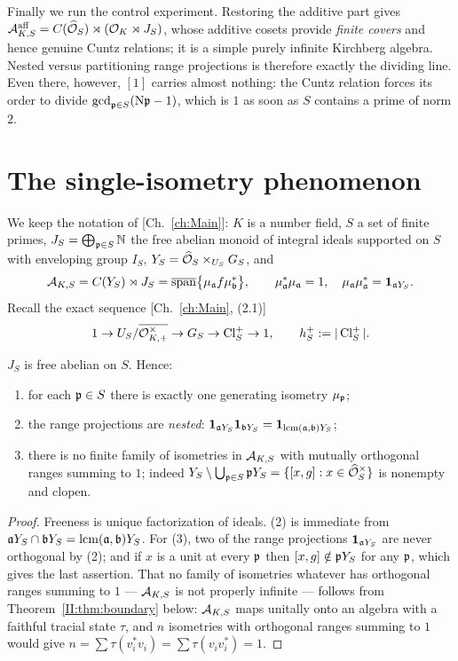 \begin{summary}
Finally we run the control experiment. Restoring the additive part gives
$\mathcal{A}^{\mathrm{aff}}_{K,S}=C(\widehat{\mathcal{O}}_S)\rtimes(\mathcal{O}_K\rtimes J_S)$, whose additive cosets provide
\emph{finite covers} and hence genuine Cuntz relations; it is a simple purely infinite
Kirchberg algebra. Nested versus partitioning range projections is therefore
exactly the dividing line. Even there, however, $[1]$ carries almost nothing: the Cuntz
relation forces its order to divide $\gcd_{\mathfrak{p}\in S}(\mathrm{N}\mathfrak{p}-1)$, which is $1$ as soon as
$S$ contains a prime of norm $2$.
\end{summary}

\section{The single-isometry phenomenon}

We keep the notation of [Ch.~\ref{ch:Main}]: $K$ is a number field, $S$ a set of finite primes,
$J_S=\bigoplus_{\mathfrak{p}\in S}\mathbb{N}$ the free abelian monoid of integral ideals supported on $S$
with enveloping group $I_S$, $Y_S=\widehat{\mathcal{O}}_S\times_{U_S}G_S$, and
\[
\mathcal{A}_{K,S}=C(Y_S)\rtimes J_S=\overline{\operatorname{span}}\bigl\{\mu_{\mathfrak{a}} f\mu_{\mathfrak{b}}^*\bigr\},
\qquad \mu_{\mathfrak{a}}^*\mu_{\mathfrak{a}}=1,\quad \mu_{\mathfrak{a}}\mu_{\mathfrak{a}}^*=\mathbf 1_{\mathfrak{a} Y_S}.
\]
Recall the exact sequence [Ch.~\ref{ch:Main}, (2.1)]
\begin{equation}\label{II:eq:exact}
1\to U_S/\overline{\mathcal{O}^\times_{K,+}}\to G_S\to\operatorname{Cl}^+_S\to1,\qquad h^+_S:=|\operatorname{Cl}^+_S| .
\end{equation}

\begin{lemma}\label{II:lem:single}
$J_S$ is free abelian on $S$. Hence:
\begin{enumerate}
\item for each $\mathfrak{p}\in S$ there is exactly one generating isometry $\mu_{\mathfrak{p}}$;
\item the range projections are \emph{nested}:
$\mathbf 1_{\mathfrak{a} Y_S}\mathbf 1_{\mathfrak{b} Y_S}=\mathbf 1_{\mathrm{lcm}(\mathfrak{a},\mathfrak{b})Y_S}$;
\item there is no finite family of isometries in $\mathcal{A}_{K,S}$ with mutually orthogonal ranges
summing to $1$; indeed
$Y_S\setminus\bigcup_{\mathfrak{p}\in S}\mathfrak{p} Y_S=\{[x,g]:x\in\widehat{\mathcal{O}}_S^\times\}$ is nonempty and clopen.
\end{enumerate}
\end{lemma}

\begin{proof}
Freeness is unique factorization of ideals. (2) is immediate from
$\mathfrak{a} Y_S\cap\mathfrak{b} Y_S=\mathrm{lcm}(\mathfrak{a},\mathfrak{b})Y_S$. For (3), two of the range projections
$\mathbf 1_{\mathfrak{a} Y_S}$ are never orthogonal by (2); and if $x$ is a unit at every $\mathfrak{p}$ then
$[x,g]\notin\mathfrak{p} Y_S$ for any $\mathfrak{p}$, which gives the last assertion. That no family of
isometries whatever has orthogonal ranges summing to $1$ --- $\mathcal{A}_{K,S}$ is not properly
infinite --- follows from Theorem~\ref{II:thm:boundary} below: $\mathcal{A}_{K,S}$ maps unitally onto
an algebra with a faithful tracial state $\tau$, and $n$ isometries with orthogonal ranges
summing to $1$ would give $n=\sum\tau(v_i^*v_i)=\sum\tau(v_iv_i^*)=1$.
\end{proof}

